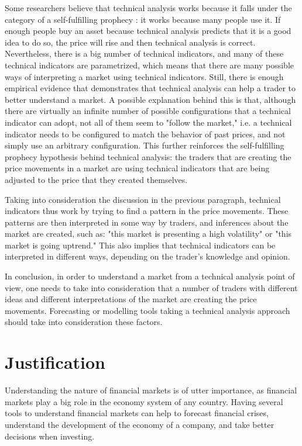 Some researchers believe that technical analysis works because it falls under
the category of a self-fulfilling prophecy \cite{salganik2008leading}: it works
because many people use it. If enough people buy an asset because technical
analysis predicts that it is a good idea to do so, the price will rise and then
technical analysis is correct. Nevertheless, there is a big number of technical
indicators, and many of these technical indicators are parametrized, which means
that there are many possible ways of interpreting a market using technical
indicators. Still, there is enough empirical evidence that demonstrates that
technical analysis can help a trader to better understand a market. A possible
explanation behind this is that, although there are virtually an infinite number
of possible configurations that a technical indicator can adopt, not all of them
seem to "follow the market," i.e. a technical indicator needs to be configured
to match the behavior of past prices, and not simply use an arbitrary
configuration. This further reinforces the self-fulfilling prophecy hypothesis
behind technical analysis: the traders that are creating the price movements in
a market are using technical indicators that are being adjusted to the price
that they created themselves.

Taking into consideration the discussion in the previous paragraph, technical
indicators thus work by trying to find a pattern in the price movements. These
patterns are then interpreted in some way by traders, and inferences about the
market are created, such as: "this market is presenting a high volatility" or
"this market is going uptrend." This also implies that technical indicators can
be interpreted in different ways, depending on the trader's knowledge and
opinion.

In conclusion, in order to understand a market from a technical analysis point
of view, one needs to take into consideration that a number of traders with
different ideas and different interpretations of the market are creating the
price movements. Forecasting or modelling tools taking a technical analysis
approach should take into consideration these factors.

\section{Justification}
\label{section:justification}

Understanding the nature of financial markets is of utter importance, as
financial markets play a big role in the economy system of any country. Having
several tools to understand financial markets can help to forecast financial
crises, understand the development of the economy of a company, and take better
decisions when investing.

